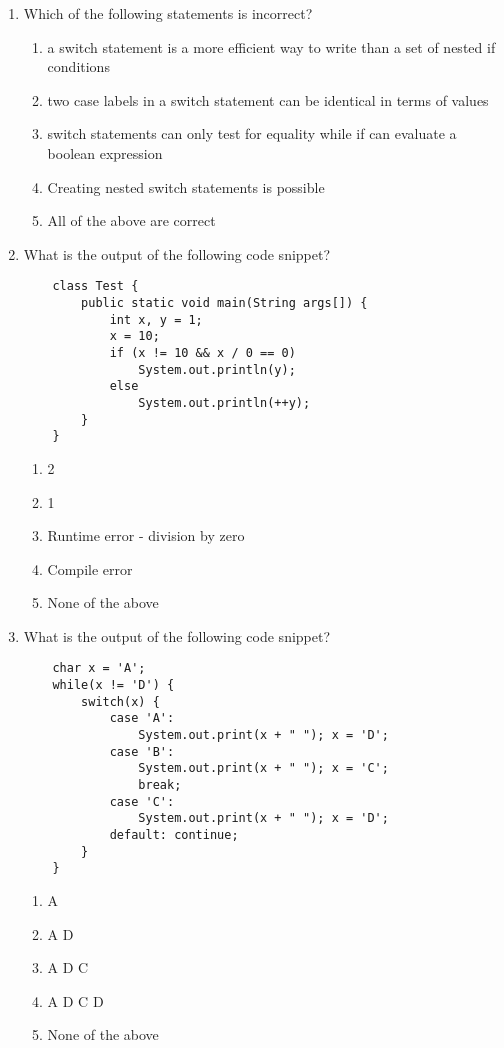 \documentclass[S17-Final.tex]{subfiles}
\begin{document}
\begin{enumerate}
\item Which of the following statements is incorrect?
	
\begin{enumerate}
\item  a switch statement is a more efficient way to write than a set of nested if conditions
\item  two case labels in a switch statement can be identical in terms of values \ifdraft \Ans \fi 
\item  switch statements can only test for equality while if can evaluate a boolean expression
\item  Creating nested switch statements is possible
\item  All of the above are correct
\end{enumerate}

\item What is the output of the following code snippet?
\begin{lstlisting}
    class Test {
        public static void main(String args[]) {
            int x, y = 1;
            x = 10;
            if (x != 10 && x / 0 == 0)
                System.out.println(y);
            else
                System.out.println(++y);
        }
    }
\end{lstlisting}
	
\begin{enumerate}
\item  2 \ifdraft \Ans \fi 
\item  1
\item  Runtime error - division by zero
\item  Compile error
\item  None of the above
\end{enumerate}

\item What is the output of the following code snippet?
\begin{lstlisting}
    char x = 'A';
    while(x != 'D') { 
        switch(x) { 
            case 'A': 
                System.out.print(x + " "); x = 'D'; 
            case 'B': 
                System.out.print(x + " "); x = 'C'; 
                break; 
            case 'C': 
                System.out.print(x + " "); x = 'D'; 
            default: continue;
        }
    }

\end{lstlisting}
	
\begin{enumerate}
\item  A
\item  A D
\item  A D C \ifdraft \Ans \fi 
\item  A D C D
\item  None of the above
\end{enumerate}


\end{enumerate}
\end{document}
